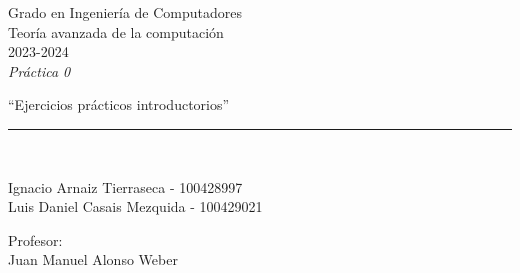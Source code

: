 \def\degree{Grado en Ingeniería de Computadores}
\def\subject{Teoría avanzada de la computación}
\def\year{2023-2024}
\def\labType{Práctica 0}
\def\labName{Ejercicios prácticos introductorios}
\def\proffesor{Juan Manuel Alonso Weber}

\begin{titlepage}
	\begin{sffamily}
	\color{azulUC3M}
	\begin{center}

		\begin{figure}[H]
		\end{figure}
		\vspace{1.5cm}

		\begin{Large}
			\degree\\
            \subject\\
			\year\\
			\vspace{2cm}		
			\textsl{\labType}
			\bigskip
			
		\end{Large}

		{\Huge ``\labName''}\\

		\vspace*{0.5cm}
		\rule{10.5cm}{0.1mm}\\
		\vspace*{0.9cm}
		
 		{\LARGE Ignacio Arnaiz Tierraseca - 100428997}\\
 		\vspace*{0.2cm}
 		{\LARGE Luis Daniel Casais Mezquida - 100429021}\\
 		\vspace*{0.2cm}
		
		\vspace*{0.8cm}
		
		\begin{Large}
		    Profesor:\\
			\proffesor\\
		\end{Large}

	\end{center}
	\vfill
	\end{sffamily}
\end{titlepage}